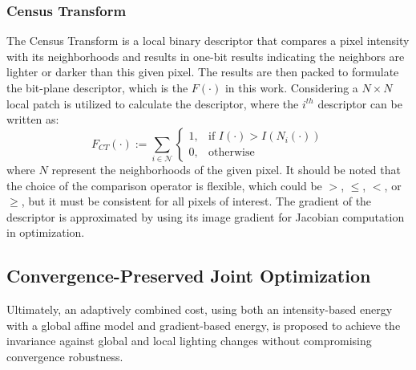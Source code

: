 \subsubsection{Census Transform}
\label{sec:census}
The Census Transform \cite{alismail2016direct} is a local binary descriptor that compares a pixel intensity with its neighborhoods and results in one-bit results indicating the neighbors are lighter or darker than this given pixel. The results are then packed to formulate the bit-plane descriptor, which is the $F(\cdot)$ in this work. Considering a $N \times N$ local patch is utilized to calculate the descriptor, where the $i^{th}$ descriptor can be written as:
\begin{equation} \label{eq:illumination_ct}
F_{CT}(\cdot) :=  \sum_{i \in \mathcal{N}} 
\begin{cases}
    1,              & \text{if } I(\cdot) > I(N_i(\cdot))\\
    0,              & \text{otherwise}
\end{cases}   
\end{equation}
where $N$ represent the neighborhoods of the given pixel. It should be noted that the choice of the comparison operator is flexible, which could be $>$, $\leq$, $<$, or $\geq$, but it must be consistent for all pixels of interest. The gradient of the descriptor is approximated by using its image gradient for Jacobian computation in optimization.

\subsection{Convergence-Preserved Joint Optimization}

Ultimately, an adaptively combined cost, using both an intensity-based energy with a global affine model and gradient-based energy, is proposed to achieve the invariance against global and local lighting changes without compromising convergence robustness.   

